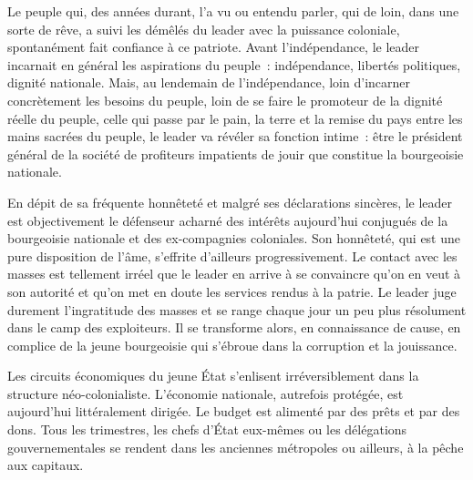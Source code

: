 \documentclass[french,twoside]{book} %
\begin{document}
Le peuple qui, des années durant, l’a vu ou entendu parler, qui de loin, dans une sorte de rêve, a suivi les démêlés du leader avec la puissance coloniale, spontanément fait confiance à ce patriote. Avant l’indépendance, le leader incarnait en général les aspirations du peuple : indépendance, libertés politiques, dignité nationale. Mais, au lendemain de l’indépendance, loin d’incarner concrètement les besoins du peuple, loin de se faire le promoteur de la dignité réelle du peuple, celle qui passe par le pain, la terre et la remise du pays entre les mains sacrées du peuple, le leader va révéler sa fonction intime : être le président général de la société de profiteurs impatients de jouir que constitue la bourgeoisie nationale.\par
En dépit de sa fréquente honnêteté et malgré ses déclarations sincères, le leader est objectivement le défenseur acharné des intérêts aujourd’hui conjugués de la bourgeoisie nationale et des ex-compagnies coloniales. Son honnêteté, qui est une pure   disposition de l’âme, s’effrite d’ailleurs progressivement. Le contact avec les masses est tellement irréel que le leader en arrive à se convaincre qu’on en veut à son autorité et qu’on met en doute les services rendus à la patrie. Le leader juge durement l’ingratitude des masses et se range chaque jour un peu plus résolument dans le camp des exploiteurs. Il se transforme alors, en connaissance de cause, en complice de la jeune bourgeoisie qui s’ébroue dans la corruption et la jouissance.\par
Les circuits économiques du jeune État s’enlisent irréversiblement dans la structure néo-colonialiste. L’économie nationale, autrefois protégée, est aujourd’hui littéralement dirigée. Le budget est alimenté par des prêts et par des dons. Tous les trimestres, les chefs d’État eux-mêmes ou les délégations gouvernementales se rendent dans les anciennes métropoles ou ailleurs, à la pêche aux capitaux.\par
\end{document}
